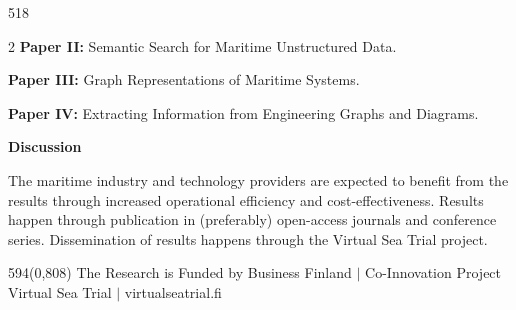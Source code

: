 \documentclass{article}
\makeatletter
\newcommand{\bodyWidth}{518}       %
\renewcommand{\section}[1]{%
  \par\addvspace{1.2em}%
  {\headingfont\bfseries\fontsize{34pt}{40pt}\selectfont
   \color{poster@text}#1\par}%
  \nopagebreak\addvspace{0.15em}%
}
\newcommand{\poslabel}[1]{\textbf{#1}}
\makeatother
\begin{document}
\begin{textblock}{\bodyWidth}
\begin{multicols}{2}
    \poslabel{Paper II:} Semantic Search for Maritime Unstructured Data.

    \poslabel{Paper III:} Graph Representations of Maritime Systems.

    \poslabel{Paper IV:} Extracting Information from Engineering Graphs and
    Diagrams.

    \section{Discussion}
    The maritime industry and technology providers are expected to benefit
    from the results through increased operational efficiency and
    cost-effectiveness. Results happen through publication in (preferably)
    open-access journals and conference series. Dissemination of results
    happens through the Virtual Sea Trial project.

  \end{multicols}
\end{textblock}

\begin{textblock}{594}(0,808)
  \color{poster@text}\fontsize{14pt}{18pt}\selectfont\centering
  The Research is Funded by Business Finland \quad$|$\quad
  Co-Innovation Project Virtual Sea Trial \quad$|$\quad
  virtualseatrial.fi
\end{textblock}
\end{document}
